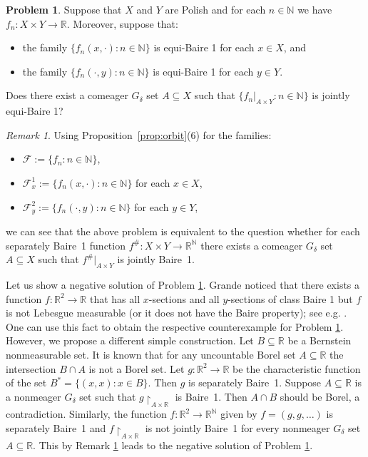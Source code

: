 \documentclass[a4paper]{amsart}
\theoremstyle{plain}
\theoremstyle{definition}
\newtheorem{problem}[theorem]{Problem}
\theoremstyle{remark}
\newtheorem{remark}[theorem]{Remark}
\numberwithin{equation}{section}
\newcommand{\N}{\mathbb N}
\newcommand{\R}{\mathbb R}
\begin{document}
\begin{problem}\label{prob2}
Suppose that $X$ and $Y$ are Polish and for each $n\in\mathbb{N}$ we have $f_n\colon X\times Y\to\mathbb{R}$.
Moreover, suppose that:
\begin{itemize}
\item the family $\{f_n(x,\cdot) \colon n\in\mathbb{N}\}$ is equi-Baire 1 for each $x\in X$, and
\item the family $\{f_n(\cdot,y) \colon n\in\mathbb{N}\}$ is equi-Baire 1 for each $y\in Y$.
\end{itemize}
Does there exist a comeager $G_\delta$ set $A\subseteq X$ such that $\{f_n|_{A\times Y}\colon n\in\mathbb{N}\}$ is jointly equi-Baire 1?
\end{problem}

\begin{remark} \label{rem:Gr}
Using Proposition~\ref{prop:orbit}(6) for the families:
\begin{itemize}
\item $\mathcal{F}:=\{f_n\colon n\in\mathbb{N}\}$,
\item $\mathcal{F}^1_{x}:=\{f_n(x,\cdot) \colon n\in\mathbb{N}\}$ for each $x\in X$, 
\item $\mathcal{F}^2_{y}:=\{f_n(\cdot,y) \colon n\in\mathbb{N}\}$ for each $y\in Y$,
\end{itemize}
we can see that the above problem is equivalent to the question whether for each separately Baire~1
function $f^{\#}\colon X\times Y\to \mathbb{R}^\mathbb{N}$ there exists 
a comeager $G_\delta$ set $A\subseteq X$ such that $f^{\#}|_{A\times Y}$ is jointly Baire~1.
\end{remark}

Let us show a negative solution of Problem \ref{prob2}. Grande noticed that there exists a function $f\colon\R^2\to\R$ that has all $x$-sections and all $y$-sections of class Baire 1 but $f$ is not
Lebesgue measurable (or it does not have the Baire property); see e.g. \cite[Remark 2]{Gr}.
One can use this fact to obtain the respective counterexample for Problem \ref{prob2}. However, we propose a different simple construction.
Let $B\subseteq\R$ be a Bernstein nonmeasurable set. It is known that for any uncountable Borel set $A\subseteq\R$ the intersection $B\cap A$ is not a Borel set. Let 
$g\colon\R^2\to\R$ be the characteristic function of the set $B^*=\{(x,x)\colon x\in B\}$.
Then $g$ is separately Baire~1. Suppose $A\subseteq\R$ is a nonmeager $G_\delta$ set such that
$g\restriction_{A\times\R}$ is Baire~1. Then $A\cap B$ should be Borel, a contradiction.
Similarly, the function $f\colon\R^2\to\R^\N$ given by $f=(g,g,\dots)$ is separately Baire~1
and $f\restriction_{A\times\R}$ is not jointly Baire~1 for every nonmeager $G_\delta$ set $A\subseteq\R$.
This by Remark \ref{rem:Gr} leads to the negative solution of Problem \ref{prob2}.
\end{document}
